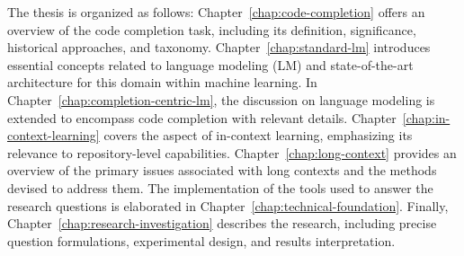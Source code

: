 The thesis is organized as follows: Chapter~\ref{chap:code-completion} offers an overview of the code completion task, including its definition, significance, historical approaches, and taxonomy. Chapter~\ref{chap:standard-lm} introduces essential concepts related to language modeling (LM) and state-of-the-art architecture for this domain within machine learning. In Chapter~\ref{chap:completion-centric-lm}, the discussion on language modeling is extended to encompass code completion with relevant details. Chapter~\ref{chap:in-context-learning} covers the aspect of in-context learning, emphasizing its relevance to repository-level capabilities. Chapter~\ref{chap:long-context} provides an overview of the primary issues associated with long contexts and the methods devised to address them. The implementation of the tools used to answer the research questions is elaborated in Chapter~\ref{chap:technical-foundation}. Finally, Chapter~\ref{chap:research-investigation} describes the research, including precise question formulations, experimental design, and results interpretation.

